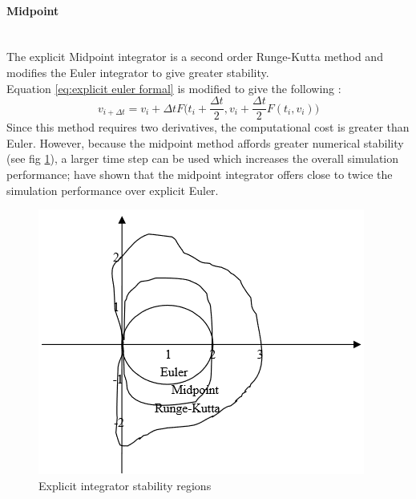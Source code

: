 \paragraph{Midpoint}\leavevmode\\
The explicit Midpoint integrator is a second order Runge-Kutta method and modifies the Euler integrator to give greater stability.
\\Equation \ref{eq:explicit euler formal} is modified to give the following \parencite[3]{Wang2009a}:
\begin{equation}
\label{eq:midpoint}
  v_{i + \Delta t} = v_{i} + \Delta t F\bigg(t_{i} + \frac{\Delta t}{2}, v_{i} + \frac{\Delta t}{2}F(t_{i}, v_{i})\bigg)
\end{equation}
Since this method requires two derivatives, the computational cost is greater than Euler. However, because the midpoint method affords greater numerical stability (see fig \ref{fig:stability regions}), a larger time step can be used which increases the overall simulation performance; \textcite{Wang2009a} have shown that the midpoint integrator offers close to twice the simulation performance over explicit Euler.
\begin{figure}[tp]
   \begin{center}
     \includegraphics{Figures/stability_diagram.png}
   \end{center}
   \caption[Explicit integrator stability regions]{Explicit integrator stability regions \parencite[4]{Wang2009a}}
   \label{fig:stability regions}
\end{figure}

